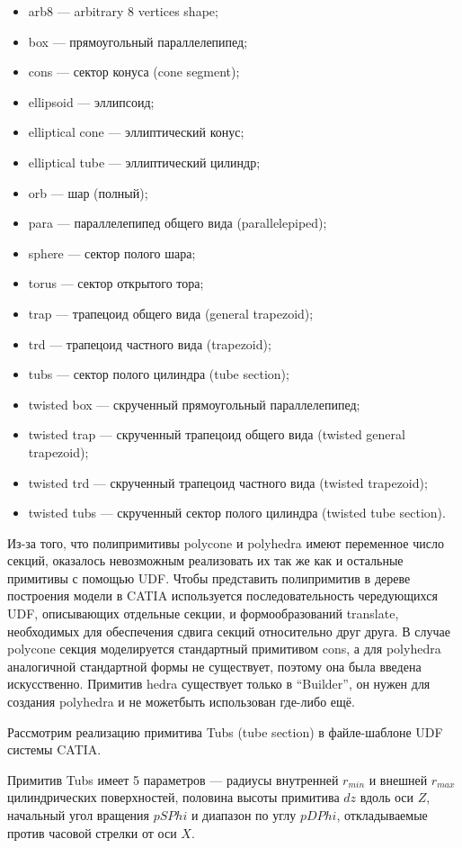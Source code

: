 \begin{itemize}
\item arb8 --- arbitrary 8 vertices shape;
\item box --- прямоугольный параллелепипед;
\item cons --- сектор конуса (cone segment);
\item ellipsoid --- эллипсоид;
\item elliptical cone --- эллиптический конус;
\item elliptical tube --- эллиптический цилиндр;
\item orb --- шар (полный);
\item para --- параллелепипед общего вида (parallelepiped);
\item sphere --- сектор полого шара;
\item torus --- сектор открытого тора;
\item trap --- трапецоид общего вида (general trapezoid);
\item trd --- трапецоид частного вида (trapezoid);
\item tubs --- сектор полого цилиндра (tube section);
\item twisted box --- скрученный прямоугольный параллелепипед;
\item twisted trap --- скрученный трапецоид общего вида (twisted general trapezoid);
\item twisted trd --- скрученный трапецоид частного вида (twisted trapezoid);
\item twisted tubs --- скрученный сектор полого цилиндра (twisted tube section).
\end{itemize}

Из-за того, что полипримитивы polycone и polyhedra имеют переменное число секций, оказалось невозможным реализовать их так же как и остальные примитивы с помощью UDF. Чтобы представить полипримитив в дереве построения модели в CATIA используется последовательность чередующихся UDF, описывающих отдельные секции, и формообразований translate, необходимых для обеспечения сдвига секций относительно друг друга. В случае polycone секция моделируется стандартный примитивом cons, а для polyhedra аналогичной стандартной формы не существует, поэтому она была введена искусственно. Примитив hedra существует только в ``Builder'', он нужен для создания polyhedra и не можетбыть использован где-либо ещё.

Рассмотрим реализацию примитива Tubs (tube section) в файле-шаблоне UDF системы CATIA.

Примитив Tubs имеет 5 параметров --- радиусы внутренней $r_{min}$ и внешней $r_{max}$ цилиндрических поверхностей, половина высоты примитива $dz$ вдоль оси $Z$, начальный угол вращения $pSPhi$ и диапазон по углу $pDPhi$, откладываемые против часовой стрелки от оси $X$.

